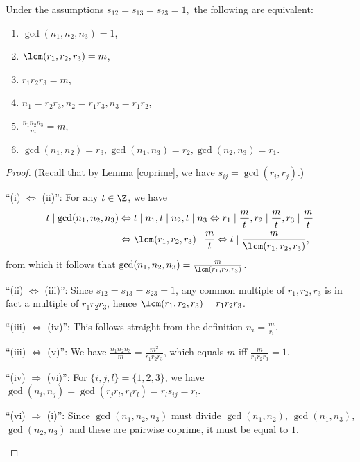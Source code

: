 \begin{lemma}\label{TFAE5}
Under the assumptions $s_{12}=s_{13}=s_{23}=1,$ the following are equivalent:
\begin{enumerate}[label={\upshape(\roman*)}]
\item $\gcd(n_1,n_2,n_3)=1$,
\item $\lcm(r_1,r_2,r_3)=m$,
\item $r_1r_2r_3=m$,
\item $n_1=r_2r_3, n_2=r_1r_3, n_3=r_1r_2$,
\item $\frac{n_1n_2n_3}{m}=m$,
\item $\gcd(n_1,n_2)=r_3, \gcd(n_1,n_3)=r_2, \gcd(n_2,n_3)=r_1$.
\end{enumerate}
\end{lemma}
\begin{proof}
\leavevmode
(Recall that by Lemma \ref{coprime}, we have $s_{ij}=\gcd(r_i,r_j)$.)
\begin{DESCRIPTION}%
\item[\enquote{(i) $\Leftrightarrow$ (ii)}:] For any $t\in\Z$, we have
\begin{align*}
t \mid \gcd(n_1,n_2,n_3) &\Leftrightarrow t \mid n_1, t\mid n_2, t\mid n_3 \Leftrightarrow r_1\mid \frac{m}{t}, r_2\mid \frac{m}{t}, r_3\mid \frac{m}{t} \\&\Leftrightarrow \lcm(r_1,r_2,r_3)\mid \frac{m}{t} \Leftrightarrow t \mid \frac{m}{ \lcm(r_1,r_2,r_3)},
\end{align*}
from which it follows that $ \gcd(n_1,n_2,n_3)=\frac{m}{ \lcm(r_1,r_2,r_3)}$.
\item[\enquote{(ii) $\Leftrightarrow$ (iii)}:]   Since $s_{12}=s_{13}=s_{23}=1$, any common multiple of $r_1,r_2,r_3$ is in fact a multiple of $r_1r_2r_3$, hence $\lcm(r_1,r_2,r_3)=r_1r_2r_3$.
\item[\enquote{(iii) $\Leftrightarrow$ (iv)}:] This follows straight from the definition $n_i=\frac{m}{r_i}$.
\item[\enquote{(iii) $\Leftrightarrow$ (v)}:] We have $\frac{n_1n_2n_3}{m}=\frac{m^2}{r_1r_2r_3}$, which equals $m$ iff $\frac{m}{r_1r_2r_3}=1$.
\item[\enquote{(iv) $\Rightarrow$ (vi)}:] For $\{i,j,l\}=\{1,2,3\}$, we have $\gcd(n_i,n_j)=\gcd(r_jr_l,r_ir_l)=r_ls_{ij}=r_l$.
\item[\enquote{(vi) $\Rightarrow$ (i)}:] Since $\gcd(n_1,n_2,n_3)$ must divide $\gcd(n_1,n_2)$, $\gcd(n_1,n_3)$, $\gcd(n_2,n_3)$ and these are pairwise coprime, it must be equal to $1$.
\end{DESCRIPTION}
\end{proof}

